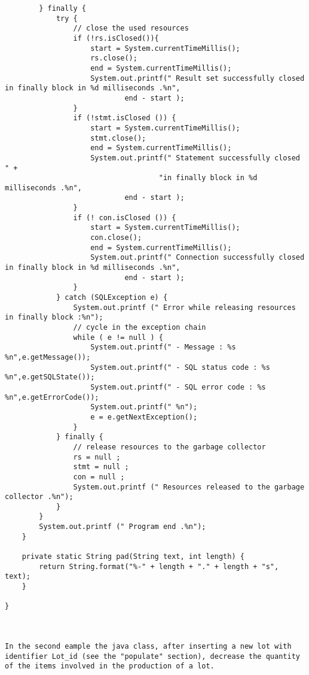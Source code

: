 \begin{lstlisting}
        } finally {
            try {
                // close the used resources
                if (!rs.isClosed()){
                    start = System.currentTimeMillis();
                    rs.close();
                    end = System.currentTimeMillis();
                    System.out.printf(" Result set successfully closed in finally block in %d milliseconds .%n",
                            end - start );
                }
                if (!stmt.isClosed ()) {
                    start = System.currentTimeMillis();
                    stmt.close();
                    end = System.currentTimeMillis();
                    System.out.printf(" Statement successfully closed " +
                                    "in finally block in %d milliseconds .%n",
                            end - start );
                }
                if (! con.isClosed ()) {
                    start = System.currentTimeMillis();
                    con.close();
                    end = System.currentTimeMillis();
                    System.out.printf(" Connection successfully closed in finally block in %d milliseconds .%n",
                            end - start );
                }
            } catch (SQLException e) {
                System.out.printf (" Error while releasing resources in finally block :%n");
                // cycle in the exception chain
                while ( e != null ) {
                    System.out.printf(" - Message : %s %n",e.getMessage());
                    System.out.printf(" - SQL status code : %s %n",e.getSQLState());
                    System.out.printf(" - SQL error code : %s %n",e.getErrorCode());
                    System.out.printf(" %n");
                    e = e.getNextException();
                }
            } finally {
                // release resources to the garbage collector
                rs = null ;
                stmt = null ;
                con = null ;
                System.out.printf (" Resources released to the garbage collector .%n");
            }
        }
        System.out.printf (" Program end .%n");
    }

    private static String pad(String text, int length) {
        return String.format("%-" + length + "." + length + "s", text);
    }

}



In the second eample the java class, after inserting a new lot with identifier Lot_id (see the "populate" section), decrease the quantity of the items involved in the production of a lot.


\end{lstlisting}
